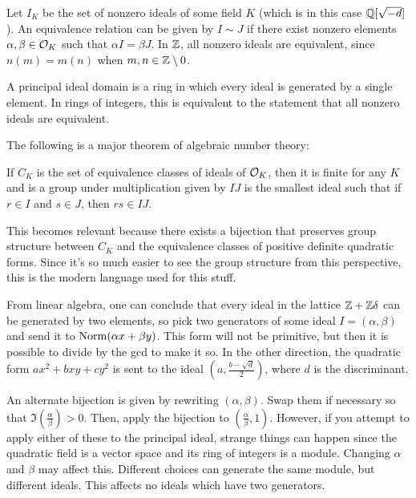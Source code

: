 Let $I_K$ be the set of nonzero ideals of some field $K$ (which is in this case $\mathbb{Q}[\sqrt{-d}]$). An equivalence relation can be given by $I \sim J$ if there exist nonzero elements $\alpha,\beta\in\mathcal{O}_K$ such that $\alpha I = \beta J$. In $\mathbb{Z}$, all nonzero ideals are equivalent, since $n(m) = m(n)$ when $m,n\in\mathbb{Z}\setminus 0$.
\begin{defn}
A principal ideal domain is a ring in which every ideal is generated by a single element. In rings of integers, this is equivalent to the statement that all nonzero ideals are equivalent.
\end{defn}
The following is a major theorem of algebraic number theory:
\begin{thm}
If $C_K$ is the set of equivalence classes of ideals of $\mathcal{O}_K$, then it is finite for any $K$ and is a group under multiplication given by $IJ$ is the smallest ideal such that if $r\in I$ and $s\in J$, then $rs\in IJ$.
\end{thm}
This becomes relevant because there exists a bijection that preserves group structure between $C_K$ and the equivalence classes of positive definite quadratic forms. Since it's so much easier to see the group structure from this perspective, this is the modern language used for this stuff.

From linear algebra, one can conclude that every ideal in the lattice $\mathbb{Z} + \mathbb{Z}\delta$ can be generated by two elements, so pick two generators of some ideal $I = (\alpha,\beta)$ and send it to $\operatorname{Norm} (\alpha x + \beta y)$. This form will not be primitive, but then it is possible to divide by the gcd to make it so. In the other direction, the quadratic form $ax^2+bxy+cy^2$ is sent to the ideal $\left(a,\frac{b-\sqrt{d}}{2}\right)$, where $d$ is the discriminant.

An alternate bijection is given by rewriting $(\alpha,\beta)$. Swap them if necessary so that $\Im\left(\frac{\alpha}{\beta}\right) >0$. Then, apply the bijection to $\left(\frac{\alpha}{\beta},1\right)$. However, if you attempt to apply either of these to the principal ideal, strange things can happen since the quadratic field is a vector space and its ring of integers is a module. Changing $\alpha$ and $\beta$ may affect this. Different choices can generate the same module, but different ideals. This affects no ideals which have two generators.

